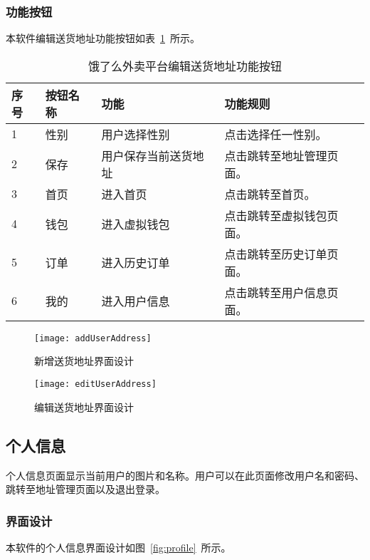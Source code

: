\subsubsection{功能按钮}
本软件编辑送货地址功能按钮如表~\ref{tab:table15}~所示。
\begin{table}[htbp]
    \caption{饿了么外卖平台编辑送货地址功能按钮}\label{tab:table15}
    \vspace{0.5em}\wuhao
    \begin{tabularx}{\textwidth}{lllX}
    \toprule[1.5pt]
    序号 & 按钮名称 & 功能 & 功能规则 \\ 
    \midrule[1pt]
    1 & 性别 & 用户选择性别 & 点击选择任一性别。 \\
    2 & 保存 & 用户保存当前送货地址 & 点击跳转至地址管理页面。 \\
    3 & 首页 & 进入首页 & 点击跳转至首页。 \\
    4 & 钱包 & 进入虚拟钱包 & 点击跳转至虚拟钱包页面。 \\
    5 & 订单 & 进入历史订单 & 点击跳转至历史订单页面。 \\
    6 & 我的 & 进入用户信息 & 点击跳转至用户信息页面。 \\
\bottomrule[1.5pt]
\end{tabularx}
\vspace{\baselineskip}
\end{table}
\begin{figure}[htbp]
    \centering
    \begin{minipage}{0.4\textwidth}
    \centering
    \texttt{[image: addUserAddress]}
    \caption{新增送货地址界面设计}\label{fig:addUserAddress}
    \end{minipage}
    \begin{minipage}{0.4\textwidth}
    \centering
    \texttt{[image: editUserAddress]}
    \caption{编辑送货地址界面设计}\label{fig:editUserAddress}
    \end{minipage}
    \vspace{\baselineskip}
\end{figure}

\subsection{个人信息}
个人信息页面显示当前用户的图片和名称。用户可以在此页面修改用户名和密码、跳转至地址管理页面以及退出登录。
\subsubsection{界面设计}
本软件的个人信息界面设计如图~\ref{fig:profile}~所示。
